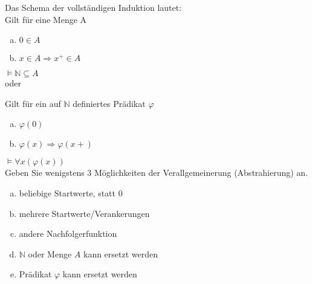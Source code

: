 \begin{card}
	Das Schema der vollständigen Induktion lautet:\\
	Gilt für eine Menge A
	\begin{enumerate}[a)]
	\item $0 \in A$
	\item $x \in A \Rightarrow x^+ \in A$
	\end{enumerate}
	$\vDash \mathbb{N} \subseteq A$\\
	
	oder 
	
	Gilt für ein auf $\mathbb{N}$ definiertes Prädikat $\varphi$	
	\begin{enumerate}[a)]
	\item $\varphi(0)$
	\item $\varphi(x) \Rightarrow \varphi(x+)$
	\end{enumerate}
	$\vDash \forall x (\varphi(x))$\\
	Geben Sie wenigstens 3 Möglichkeiten der Verallgemeinerung (Abstrahierung) an.
	\hr
	\begin{enumerate}[a)]
	\item beliebige Startwerte, statt 0
	\item mehrere Startwerte/Verankerungen
	\item andere Nachfolgerfunktion
	\item $\mathbb{N}$ oder Menge $A$ kann ersetzt werden
	\item Prädikat $\varphi$ kann ersetzt werden
	\end{enumerate}
\end{card}